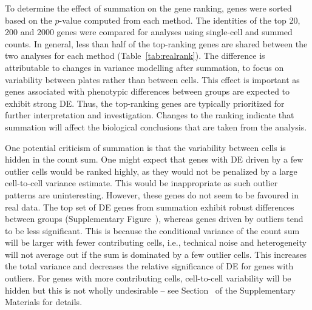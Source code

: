 \documentclass[oupdraft]{bio}
\begin{document}
To determine the effect of summation on the gene ranking, genes were sorted based on the $p$-value computed from each method.
The identities of the top 20, 200 and 2000 genes were compared for analyses using single-cell and summed counts.
In general, less than half of the top-ranking genes are shared between the two analyses for each method (Table~\ref{tab:realrank}).
The difference is attributable to changes in variance modelling after summation, to focus on variability between plates rather than between cells.
This effect is important as genes associated with phenotypic differences between groups are expected to exhibit strong DE.
Thus, the top-ranking genes are typically prioritized for further interpretation and investigation.
Changes to the ranking indicate that summation will affect the biological conclusions that are taken from the analysis.

One potential criticism of summation is that the variability between cells is hidden in the count sum.
One might expect that genes with DE driven by a few outlier cells would be ranked highly, as they would not be penalized by a large cell-to-cell variance estimate.
This would be inappropriate as such outlier patterns are uninteresting.
However, these genes do not seem to be favoured in real data.
The top set of DE genes from summation exhibit robust differences between groups (Supplementary Figure~\suppexpprof{}), whereas genes driven by outliers tend to be less significant.
This is because the conditional variance of the count sum will be larger with fewer contributing cells, 
    i.e., technical noise and heterogeneity will not average out if the sum is dominated by a few outlier cells.
This increases the total variance and decreases the relative significance of DE for genes with outliers.
For genes with more contributing cells, cell-to-cell variability will be hidden but this is not wholly undesirable 
    -- see Section~\supphiddenvar{} of the Supplementary Materials for details.

\end{document}
